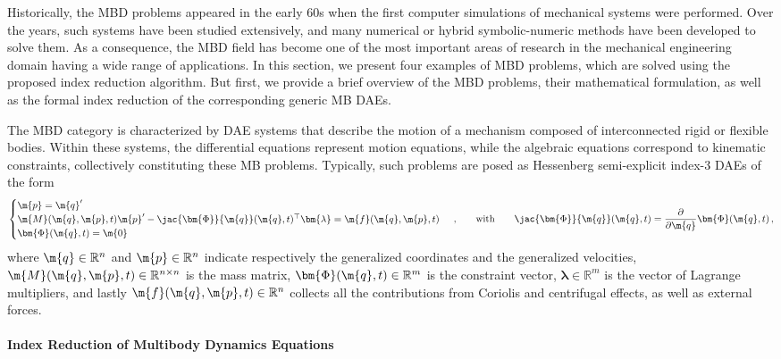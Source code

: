 Historically, the \ac{MBD} problems appeared in the early 60s when the first computer simulations of mechanical systems were performed. Over the years, such systems have been studied extensively, and many numerical or hybrid symbolic-numeric methods have been developed to solve them. As a consequence, the \ac{MBD} field has become one of the most important areas of research in the mechanical engineering domain having a wide range of applications. In this section, we present four examples of \ac{MBD} problems, which are solved using the proposed index reduction algorithm. But first, we provide a brief overview of the \ac{MBD} problems, their mathematical formulation, as well as the formal index reduction of the corresponding generic \ac{MB} \acp{DAE}.

The \ac{MBD} category is characterized by \ac{DAE} systems that describe the motion of a mechanism composed of interconnected rigid or flexible bodies. Within these systems, the differential equations represent motion equations, while the algebraic equations correspond to kinematic constraints, collectively constituting these \ac{MB} problems. Typically, such problems are posed as Hessenberg semi-explicit index-3 \acp{DAE} of the form
%
\begin{equation}
  \begin{cases}
    \m{p} = \m{q}^{\prime} \\
    \m{M}(\m{q}, \m{p}, t)\m{p}^{\prime} - \jac{\bm{\Phi}}{\m{q}}(\m{q}, t)^{\top}\bm{\lambda} = \m{f}(\m{q}, \m{p} ,t) \\
    \bm{\Phi}(\m{q}, t) = \m{0}
  \end{cases} \, \text{,}
  \qquad \text{with} \qquad \jac{\bm{\Phi}}{\m{q}}(\m{q}, t) = \dfrac{\partial}{\partial\m{q}}\bm{\Phi}(\m{q}, t)
  \, \text{,}
  \label{chap5:eq:mbd_fo}
\end{equation}
%
where $\m{q} \in \mathbb{R}^{n}$ and $\m{p} \in \mathbb{R}^{n}$ indicate respectively the generalized coordinates and the generalized velocities, $\m{M}(\m{q}, \m{p}, t) \in \mathbb{R}^{n\times n}$ is the mass matrix, $\bm{\Phi}(\m{q}, t) \in \mathbb{R}^{m}$ is the constraint vector, $\bm{\lambda} \in \mathbb{R}^{m}$ is the vector of Lagrange multipliers, and lastly $\m{f}(\m{q}, \m{p}, t) \in \mathbb{R}^{n}$ collects all the contributions from Coriolis and centrifugal effects, as well as external forces.

\paragraph{Index Reduction of Multibody Dynamics Equations}

